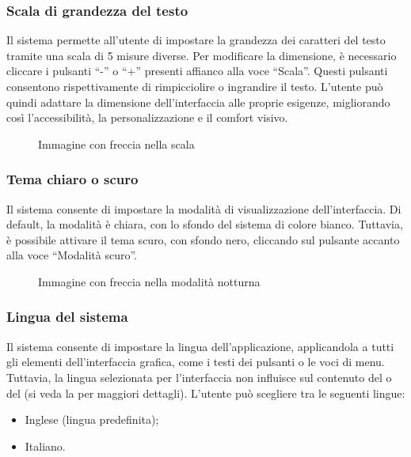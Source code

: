 \subsubsection{Scala di grandezza del testo}

\par Il sistema permette all'utente di impostare la grandezza dei caratteri del testo tramite una scala di 5 misure diverse. Per modificare la dimensione, è necessario cliccare i pulsanti ``-'' o ``+'' presenti affianco alla voce ``Scala''. Questi pulsanti consentono rispettivamente di rimpicciolire o ingrandire il testo. L'utente può quindi adattare la dimensione dell'interfaccia alle proprie esigenze, migliorando così l'accessibilità, la personalizzazione e il comfort visivo.

\begin{figure}[H]
  \centering
  \caption{Immagine con freccia nella scala}
\end{figure}

\subsubsection{Tema chiaro o scuro} \label{sec:tema}

\par Il sistema consente di impostare la modalità di visualizzazione dell'interfaccia. Di default, la modalità è chiara, con lo sfondo del sistema di colore bianco. Tuttavia, è possibile attivare il tema scuro, con sfondo nero, cliccando sul pulsante accanto alla voce ``Modalità scuro''.

\begin{figure}[H]
  \centering
  \caption{Immagine con freccia nella modalità notturna}
\end{figure}

\subsubsection{Lingua del sistema} \label{sec:lingua}

\par Il sistema consente di impostare la lingua dell'applicazione, applicandola a tutti gli elementi dell'interfaccia grafica, come i testi dei pulsanti o le voci di menu. Tuttavia, la lingua selezionata per l'interfaccia non influisce sul contenuto del  o del  (si veda la  per maggiori dettagli). L'utente può scegliere tra le seguenti lingue:
\begin{itemize}
  \item Inglese (lingua predefinita);
  \item Italiano.
\end{itemize}

